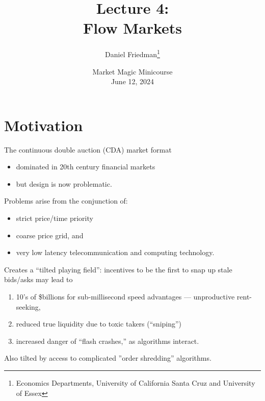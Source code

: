 \documentclass[10pt]{beamer}
\title[Lect4-Flow]{Lecture 4:\\
Flow Markets}
\author[DF]{Daniel Friedman\thanks{Economics Departments, University of California Santa Cruz and University of Essex}}
\begin{document}
\date[UNSW/Agora]{Market Magic Minicourse\\
June 12, 2024
} 

\frame{\titlepage} 






\section{Motivation}
\begin{frame}{
The continuous double auction (CDA) market format}
\begin{itemize}
\item dominated in 20th century financial markets 
\item but design is now problematic.  \pause
\end{itemize}
Problems arise from the conjunction of:
\begin{itemize}
\item strict price/time priority  
\item coarse price grid, and 
\item very low latency telecommunication and computing technology.

 \end{itemize} 
 \end{frame}

\begin{frame}{Creates a ``tilted playing field'': }
incentives to be the first to snap up stale bids/asks may lead to
 \pause
\begin{enumerate}
\item 10's of \$billions for sub-millisecond speed advantages --- unproductive rent-seeking, \pause
\item reduced true liquidity due to toxic takers (``sniping'') \pause
\item increased danger of ``flash crashes,'' as algorithms interact. \pause
  \end{enumerate}
Also tilted by access to complicated ''order shredding'' algorithms.
\end{frame}
\end{document}
